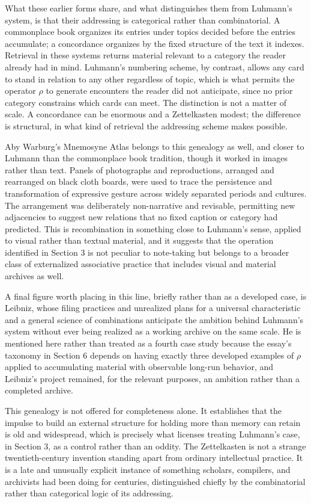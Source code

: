 \documentclass[11pt]{article}
\begin{document}
What these earlier forms share, and what distinguishes them from Luhmann's system, is that their addressing is categorical rather than combinatorial. A commonplace book organizes its entries under topics decided before the entries accumulate; a concordance organizes by the fixed structure of the text it indexes. Retrieval in these systems returns material relevant to a category the reader already had in mind. Luhmann's numbering scheme, by contrast, allows any card to stand in relation to any other regardless of topic, which is what permits the operator $\rho$ to generate encounters the reader did not anticipate, since no prior category constrains which cards can meet. The distinction is not a matter of scale. A concordance can be enormous and a Zettelkasten modest; the difference is structural, in what kind of retrieval the addressing scheme makes possible.

Aby Warburg's Mnemosyne Atlas belongs to this genealogy as well, and closer to Luhmann than the commonplace book tradition, though it worked in images rather than text. Panels of photographs and reproductions, arranged and rearranged on black cloth boards, were used to trace the persistence and transformation of expressive gesture across widely separated periods and cultures. The arrangement was deliberately non-narrative and revisable, permitting new adjacencies to suggest new relations that no fixed caption or category had predicted. This is recombination in something close to Luhmann's sense, applied to visual rather than textual material, and it suggests that the operation identified in Section 3 is not peculiar to note-taking but belongs to a broader class of externalized associative practice that includes visual and material archives as well.

A final figure worth placing in this line, briefly rather than as a developed case, is Leibniz, whose filing practices and unrealized plans for a universal characteristic and a general science of combinations anticipate the ambition behind Luhmann's system without ever being realized as a working archive on the same scale. He is mentioned here rather than treated as a fourth case study because the essay's taxonomy in Section 6 depends on having exactly three developed examples of $\rho$ applied to accumulating material with observable long-run behavior, and Leibniz's project remained, for the relevant purposes, an ambition rather than a completed archive.

This genealogy is not offered for completeness alone. It establishes that the impulse to build an external structure for holding more than memory can retain is old and widespread, which is precisely what licenses treating Luhmann's case, in Section 3, as a control rather than an oddity. The Zettelkasten is not a strange twentieth-century invention standing apart from ordinary intellectual practice. It is a late and unusually explicit instance of something scholars, compilers, and archivists had been doing for centuries, distinguished chiefly by the combinatorial rather than categorical logic of its addressing.
\end{document}
